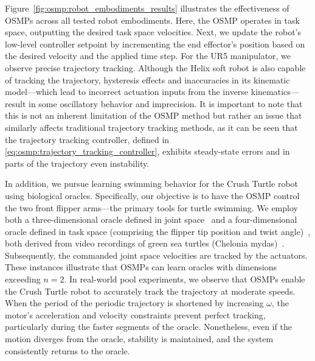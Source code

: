 Figure~\ref{fig:osmp:robot_embodiments_results} illustrates the effectiveness of OSMPs across all tested robot embodiments. 
Here, the OSMP operates in task space, outputting the desired task space velocities. Next, we update the robot’s low-level controller setpoint by incrementing the end effector’s position based on the desired velocity and the applied time step.
For the UR5 manipulator, we observe precise trajectory tracking. Although the Helix soft robot is also capable of tracking the trajectory, hysteresis effects and inaccuracies in its kinematic model—which lead to incorrect actuation inputs from the inverse kinematics—result in some oscillatory behavior and imprecision. It is important to note that this is not an inherent limitation of the \gls{OSMP} method but rather an issue that similarly affects traditional trajectory tracking methods, as it can be seen that the trajectory tracking controller, defined in \eqref{eq:osmp:trajectory_tracking_controller}, exhibits steady-state errors and in parts of the trajectory even instability.

In addition, we pursue learning swimming behavior for the Crush Turtle robot using biological oracles. Specifically, our objective is to have the \gls{OSMP} control the two front flipper arms—the primary tools for turtle swimming. We employ both a three-dimensional oracle defined in joint space~\citep{van2023soft} and a four-dimensional oracle defined in task space (comprising the flipper tip position and twist angle)~\citep{van2022new}, both derived from video recordings of green sea turtles (Chelonia mydas)~\citep{van2022new, van2023soft}. Subsequently, the commanded joint space velocities are tracked by the actuators.
These instances illustrate that \glspl{OSMP} can learn oracles with dimensions exceeding $n=2$. In real-world pool experiments, we observe that \glspl{OSMP} enable the Crush Turtle robot to accurately track the trajectory at moderate speeds. When the period of the periodic trajectory is shortened by increasing $\omega$, the motor’s acceleration and velocity constraints prevent perfect tracking, particularly during the faster segments of the oracle. Nonetheless, even if the motion diverges from the oracle, stability is maintained, and the system consistently returns to the oracle.

